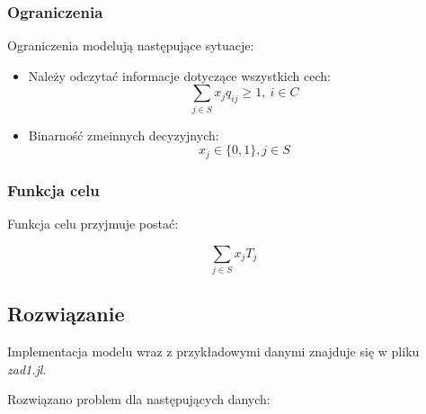 \documentclass{article}
\begin{document}
    \subsubsection{Ograniczenia}

    Ograniczenia modelują następujące sytuacje:
        \begin{itemize}
            \item Należy odczytać informacje dotyczące wszystkich cech:
                $$\sum_{j \in S} x_{j} q_{ij} \geq 1, \ i \in C$$

            \item Binarność zmeinnych decyzyjnych:
                $$x_j \in \{0, 1\}, j \in S$$

        \end{itemize}

    \subsubsection{Funkcja celu}

        Funkcja celu przyjmuje postać:

        $$\sum_{j \in S} x_j T_j$$
    
    \subsection{Rozwiązanie}
    
    Implementacja modelu wraz z przykładowymi danymi znajduje się w pliku \textit{zad1.jl}.

    Rozwiązano problem dla następujących danych:
\end{document}
